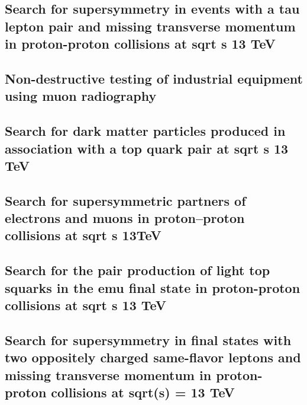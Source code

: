 \documentclass[a4paper, 11pt, twoside, openright]{report}
\begin{document}
\subsection{Search for supersymmetry in events with a tau lepton pair and missing transverse momentum in proton-proton collisions at sqrt s 13 TeV}


\subsection{Non-destructive testing of industrial equipment using muon radiography}


\subsection{Search for dark matter particles produced in association with a top quark pair at sqrt s 13 TeV}


\subsection{Search for supersymmetric partners of electrons and muons in proton–proton collisions at sqrt s 13TeV}


\subsection{Search for the pair production of light top squarks in the emu final state in proton-proton collisions at sqrt s 13 TeV}


\subsection{Search for supersymmetry in final states with two oppositely charged same-flavor leptons and missing transverse momentum in proton-proton collisions at sqrt(s) = 13 TeV}

\end{document}
